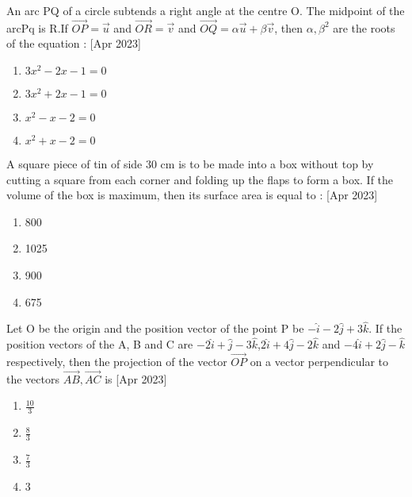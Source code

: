 

\iffalse
  \title{2023}
  \author{ai24btech11005}
  \section{mcq-single}
\fi


    \item An arc PQ of a circle subtends a right angle at the centre O. The midpoint of the arcPq is R.If $\overrightarrow{OP}=\overrightarrow{u}$ and $\overrightarrow{OR}=\overrightarrow{v}$ and $\overrightarrow{OQ}=\alpha \overrightarrow{u}+\beta \overrightarrow{v}$, then $\alpha, \beta^2$ are the roots of the equation :
    \hfill{[Apr 2023]}
        \begin{multicols}{1}
            \begin{enumerate}
                \item $3x^2-2x-1=0$
                \item $3x^2+2x-1=0$
                \item $x^2-x-2=0$
                \item $x^2+x-2=0$
            \end{enumerate}
        \end{multicols}

    \item A square piece of tin of side 30 cm is to be made into a box without top by cutting a square from each corner
and folding up the flaps to form a box. If the volume of the box is maximum, then its surface area  is
equal to :
 \hfill{[Apr 2023]}

		\begin{multicols}{4}
			\begin{enumerate}
				\item 800
				\item  1025
				\item  900
				\item  675
			\end{enumerate}
		\end{multicols}

    \item Let O be the origin and the position vector of the point P be $-\hat{i}-2\hat{j}+3\hat{k}.$ If the position vectors of the A, B
and C are $-2\hat{i}+\hat{j}-3\hat{k}$,$2\hat{i}+4\hat{j}-2\hat{k}$ and $-4\hat{i}+2\hat{j}-\hat{k}$ respectively, then the projection of the vector $\overrightarrow{OP}$ on a vector perpendicular to the vectors $\overrightarrow{AB},\overrightarrow{AC}$ is 
 \hfill{[Apr 2023]}
        \begin{multicols}{4}
            \begin{enumerate}
              \item $\frac{10}{3}$
              \item $\frac{8}{3}$
              \item $\frac{7}{3}$
              \item $3$
            \end{enumerate}
        \end{multicols}

